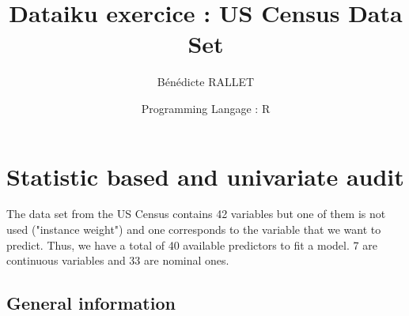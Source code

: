 \documentclass{article}
\title{Dataiku exercice : US Census Data Set}
\author{Bénédicte RALLET}
\date{Programming Langage : R}
\begin{document}
\maketitle
\vspace{2cm}
\tableofcontents
\newpage
\section{Statistic based and univariate audit}
\noindent The data set from the US Census contains 42 variables but one of them is not used ("instance weight") and one corresponds to the variable that we want to predict. Thus, we have a total of 40 available predictors to fit a model. 7 are continuous variables and 33 are nominal ones.
\subsection{General information}
\vspace{0.5cm}
\end{document}
